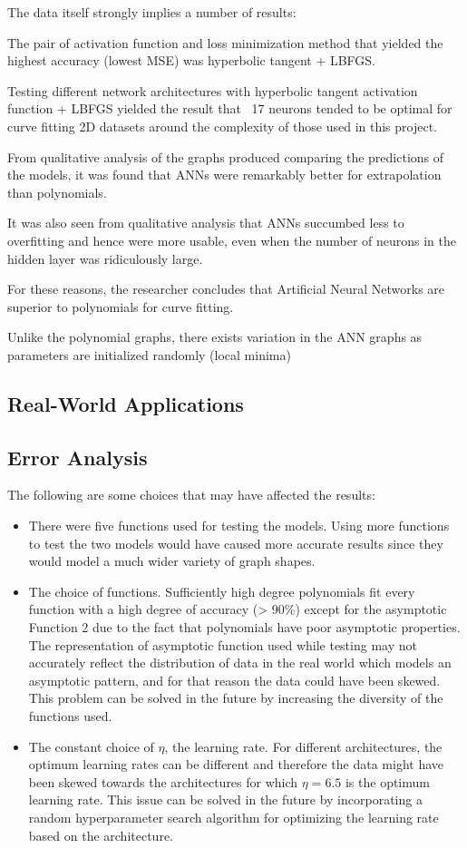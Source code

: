 \documentclass{article}
\begin{document}
The data itself strongly implies a number of results:

The pair of activation function and loss minimization method that yielded the highest accuracy (lowest MSE) was hyperbolic tangent + LBFGS.

Testing different network architectures with hyperbolic tangent activation function + LBFGS yielded the result that ~17 neurons tended to be optimal for curve fitting 2D datasets around the complexity of those used in this project.

From qualitative analysis of the graphs produced comparing the predictions of the models, it was found that ANNs were remarkably better for extrapolation than polynomials.

It was also seen from qualitative analysis that ANNs succumbed less to overfitting and hence were more usable, even when the number of neurons in the hidden layer was ridiculously large.

For these reasons, the researcher concludes that Artificial Neural Networks are superior to polynomials for curve fitting.


Unlike the polynomial graphs, there exists variation in the ANN graphs as parameters are initialized randomly (local minima)

\subsection{Real-World Applications}

\subsection{Error Analysis}

The following are some choices that may have affected the results:

\begin{itemize}
    \item There were five functions used for testing the models. Using more functions to test the two models would have caused more accurate results since they would model a much wider variety of graph shapes.
    \item The choice of functions. Sufficiently high degree polynomials fit every function with a high degree of accuracy (> 90\%) except for the asymptotic Function 2 due to the fact that polynomials have poor asymptotic properties. The representation of asymptotic function used while testing may not accurately reflect the distribution of data in the real world which models an asymptotic pattern, and for that reason the data could have been skewed. This problem can be solved in the future by increasing the diversity of the functions used.
    \item The constant choice of $\eta$, the learning rate. For different architectures, the optimum learning rates can be different and therefore the data might have been skewed towards the architectures for which $\eta=6.5$ is the optimum learning rate. This issue can be solved in the future by incorporating a random hyperparameter search algorithm for optimizing the learning rate based on the architecture.
\end{itemize}
\end{document}
